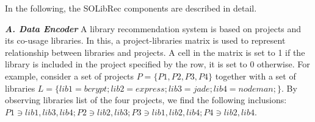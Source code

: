 \documentclass[paper]{ieice}
\begin{document}

In the following, the SOLibRec components are described in detail. 




 

\textit{\textbf{A. Data Encoder}}
A library recommendation system is based on projects and its co-usage libraries. In this, a project-libraries matrix is used to represent relationship between libraries and projects. A cell in the matrix is set to 1 if the library is included in the project specified by the row, it is set to 0 otherwise. For example, consider a set of projects $P=\{P1, P2, P3, P4\}$ together with a set of libraries $L=\{lib1=bcrypt; lib2=express; lib3=jade; lib4=nodeman;\}$. By observing libraries list of the four projects, we find the following inclusions: $P1\ni lib1, lib3, lib4; P2\ni lib2, lib3; P3\ni lib1, lib2, lib4; P4\ni lib2, lib4$.
\end{document}
